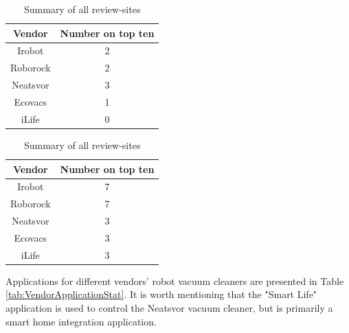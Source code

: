 \begin{table}[H]
\begin{subtable}[b]{0.45\linewidth}
        \begin{tabular}{|c|c|}
            \hline
            \textbf{Vendor}    & \textbf{Number on top ten} \\ \hline
            Irobot      & 2                 \\                   \hline
            Roborock    & 2                 \\                   \hline
            Neatsvor    & 3                 \\                   \hline
            Ecovacs     & 1                 \\                   \hline
            iLife       & 0                 \\                   \hline
        \end{tabular}
    \end{subtable}
    \hspace{0.5cm}
    \begin{subtable}[b]{0.45\linewidth}
        \centering
        \caption{Summary of all review-sites}
        \begin{tabular}{|c|c|}
            \hline
            \textbf{Vendor}    & \textbf{Number on top ten} \\ \hline
            Irobot      & 7                 \\                   \hline
            Roborock    & 7                 \\                   \hline
            Neatsvor    & 3                 \\                   \hline
            Ecovacs     & 3                 \\                   \hline
            iLife       & 3                 \\                   \hline
        \end{tabular}
    \end{subtable}
    \label{tab:Robotreviewsites}
\end{table}

Applications for different vendors' robot vacuum cleaners are presented in Table \ref{tab:VendorApplicationStat}. It is worth mentioning that the "Smart Life" application is used to control the Neatsvor vacuum cleaner, but is primarily a smart home integration application. 

